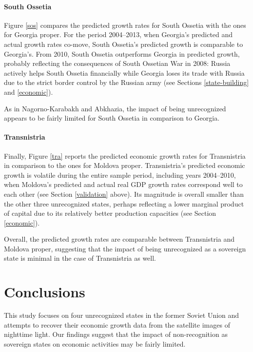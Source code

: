 \documentclass[12pt,a4paper]{article}%
\begin{document}
\paragraph{South Ossetia}
Figure \ref{sos} compares the predicted growth rates for South Ossetia with the ones for Georgia proper.
For the period 2004--2013, when Georgia's predicted and actual growth rates co-move, South Ossetia's predicted growth is comparable to Georgia's.
From 2010, South Ossetia outperforms Georgia in predicted growth, probably reflecting the consequences of South Ossetian War in 2008: Russia actively helps South Ossetia financially while Georgia loses its trade with Russia due to the strict border control by the Russian army (see Sections \ref{state-building} and \ref{economic}).

As in Nagorno-Karabakh and Abkhazia, the impact of being unrecognized appears to be fairly limited for South Ossetia in comparison to Georgia.

\paragraph{Transnistria}
Finally, Figure \ref{tra} reports the predicted economic growth rates for Transnistria in comparison to the ones for Moldova proper. 
Transnistria's predicted economic growth is volatile during the entire sample period, including years 2004--2010, when Moldova's predicted and actual real GDP growth rates correspond well to each other (see Section \ref{validation} above). 
Its magnitude is overall smaller than the other three unrecognized states, perhaps reflecting a lower marginal product of capital due to its relatively better production capacities (see Section \ref{economic}).

Overall, the predicted growth rates are comparable between Transnistria and Moldova proper, suggesting that the impact of being unrecognized as a sovereign state is minimal in the case of Transnistria as well.

\section{Conclusions}\label{conclusions}
This study focuses on four unrecognized states in the former Soviet Union and attempts to recover their economic growth data from the satellite images of nighttime light. 
Our findings suggest that the impact of non-recognition as sovereign states on economic activities may be fairly limited. 
\end{document}
